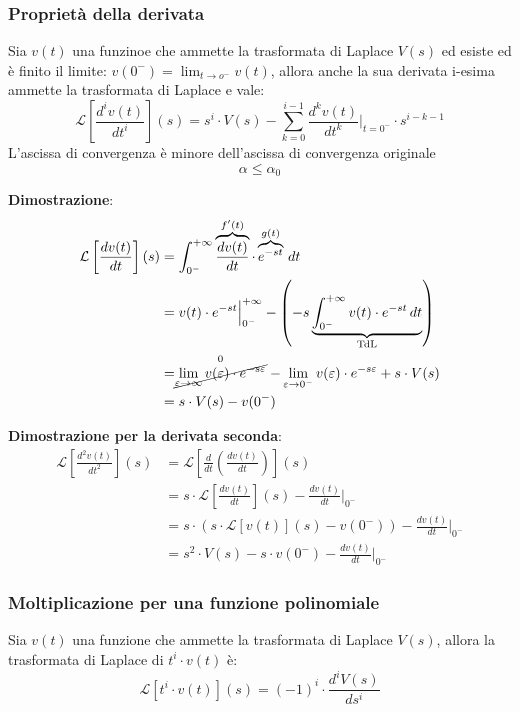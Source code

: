 \documentclass[a4paper]{article}
\begin{document}
\subsubsection{Proprietà della derivata}
\label{subsubsec:derivata}
Sia \( v(t) \) una funzinoe che ammette la trasformata di Laplace \( V(s) \) ed
esiste ed è finito il limite: \( v(0^-)= \lim_{t \to o^-} v(t) \), allora anche la
sua derivata i-esima ammette la trasformata di Laplace e vale:
\[
  \mathcal{L}\left[ \frac{d^{i} v(t)}{dt^{i}} \right](s) = s^{i} \cdot V(s) -
  \sum_{k=0}^{i-1} \frac{d^k v(t)}{dt^k} \Big|_{t=0^-} \cdot s^{i-k-1}
\] 
L'ascissa di convergenza è minore dell'ascissa di convergenza originale
\[
  \alpha \le \alpha_0
\] 

\vspace{1em}
\noindent
\textbf{Dimostrazione}:
\[
  \begin{aligned}
    \mathcal{L}\left[\frac{d v(t)}{dt}\right](s) &= \int_{0^-}^{+\infty} \overbrace{\frac{d v(t)}{dt}}^{
    f'(t)} \cdot \overbrace{e^{-st}}^{g(t)} \, dt\\
    &= v(t) \cdot e^{-st} \Big|_{0^-}^{+\infty} - \left( 
    -s \underbrace{\int_{0^-}^{+\infty} v(t) \cdot e^{-st} \, dt}_{\text{TdL}} \right)\\
    &= \stackrel{0}{\cancel{\lim_{\varepsilon \to \infty} v(\varepsilon )
    \cdot e^{-s \varepsilon }}} - \lim_{\varepsilon \to 0^-}
    v(\varepsilon ) \cdot e^{-s \varepsilon } + s \cdot V(s)\\
    &= s \cdot V(s) - v(0^-)
  \end{aligned}
\] 

\vspace{1em}
\noindent
\textbf{Dimostrazione per la derivata seconda}:
\[
\begin{aligned}
  \mathcal{L}\left[ \frac{d^{2} v(t)}{dt^{2}} \right](s) &= \mathcal{L}\left[ \frac{d}{dt}
  \left( \frac{d v(t)}{dt} \right) \right](s)\\
    &= s \cdot \mathcal{L}\left[
    \frac{d v(t)}{dt} \right](s) - 
    \frac{d v(t)}{dt} \Big|_{0^-}\\
    &= s \cdot \left( s \cdot \mathcal{L}[v(t)](s) - v(0^-) \right) -
    \frac{d v(t)}{dt} \Big|_{0^-}\\
    &= s^{2} \cdot V(s) - s \cdot v(0^-) - \frac{d v(t)}{dt} \Big|_{0^-}
\end{aligned}
\] 

\subsubsection{Moltiplicazione per una funzione polinomiale}
Sia \( v(t) \) una funzione che ammette la trasformata di Laplace \( V(s) \), allora
la trasformata di Laplace di \( t^{i} \cdot v(t) \) è:
\[
  \mathcal{L}[t^{i} \cdot v(t)](s) = (-1)^{i} \cdot \frac{d^{i} V(s)}{ds^{i}}
\] 
\end{document}
